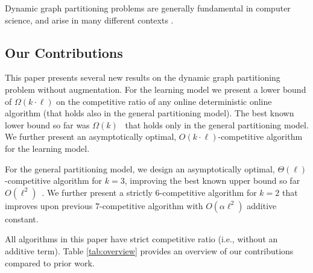 \documentclass[a4paper,anonymous,USenglish]{lipics-v2019}
\begin{document}
Dynamic graph partitioning problems are generally fundamental in computer science, and arise in many different contexts \cite{streaming-soda,streaming1}.


\subsection{Our Contributions}

This paper presents several new results on the dynamic graph partitioning problem  without augmentation.
For the learning model we present a lower bound of $\Omega(k\cdot\ell)$ on the competitive ratio of any online deterministic online algorithm 
(that holds also in the general partitioning model).
The best known lower bound so far was $\Omega(k)$~\cite{repartition-disc} that holds only in the general partitioning model.
We further present an asymptotically optimal, 
$O(k\cdot \ell)$-competitive algorithm
for the learning model.

For the general partitioning model, we design
an asymptotically optimal,
$\Theta(\ell)$-competitive algorithm for $k=3$, improving the best known upper bound 
so far $O(\ell^2)$~\cite{repartition-disc}.
We further present a strictly $6$-competitive algorithm for $k=2$ that improves upon previous $7$-competitive algorithm with $O(\alpha\ell^2)$ additive constant.

All algorithms in this paper have strict competitive ratio (i.e., without an additive term).
Table \ref{tab:overview} provides an overview of our contributions compared to prior work.
\end{document}
